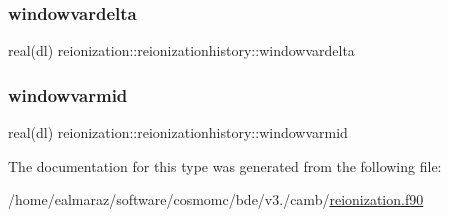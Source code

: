 \subsubsection{\texorpdfstring{windowvardelta}{windowvardelta}}
{\footnotesize\ttfamily real(dl) reionization\+::reionizationhistory\+::windowvardelta}

\mbox{\label{structreionization_1_1reionizationhistory_a8aa8eac099f46d74aeac1c76597d571d}} 
\subsubsection{\texorpdfstring{windowvarmid}{windowvarmid}}
{\footnotesize\ttfamily real(dl) reionization\+::reionizationhistory\+::windowvarmid}



The documentation for this type was generated from the following file\+:\begin{DoxyCompactItemize}
\item 
/home/ealmaraz/software/cosmomc/bde/v3./camb/\mbox{\hyperlink{reionization_8f90}{reionization.\+f90}}\end{DoxyCompactItemize}
